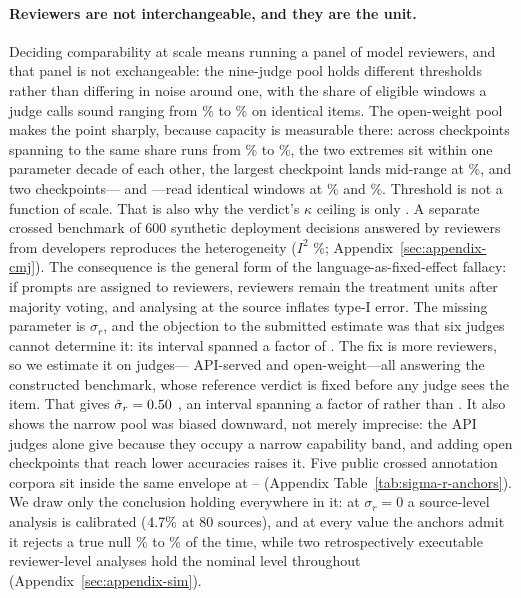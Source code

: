 \documentclass[11pt]{article}
\begin{document}
\paragraph{Reviewers are not interchangeable, and they are the unit.}
Deciding comparability at scale means running a panel of model reviewers, and
that panel is not exchangeable: the nine-judge pool holds different thresholds
rather than differing in noise around one, with the share of eligible windows a
judge calls sound ranging from \TierSurvivesLo\% to \TierSurvivesHi\% on
identical items. The open-weight pool makes the point sharply, because capacity is
measurable there: across \OwjNOpen{} checkpoints spanning \OwjPairSize{} to
\OwjBigSize{} the same share runs from \OwjSurvLo\% to \OwjSurvHi\%, the two
extremes sit within one parameter decade of each other, the largest checkpoint
lands mid-range at \OwjBigSurv\%, and two \OwjPairSize{} checkpoints---
\texttt{\OwjPairLoName{}} and \texttt{\OwjPairHiName{}}---read identical
windows at \OwjPairLo\% and \OwjPairHi\%. Threshold is not a function of
scale.
That is also why the verdict's $\kappa$ ceiling is only \KmaxVerdict{}. A separate crossed benchmark of 600 synthetic deployment
decisions answered by \CMJmodels{} reviewers from \CMJdevelopers{} developers
reproduces the heterogeneity ($I^2$ \CMJCtwoIsq\%;
Appendix~\ref{sec:appendix-cmj}). The consequence is the general form of the
language-as-fixed-effect fallacy: if prompts are assigned to reviewers,
reviewers remain the treatment units after majority voting, and analysing at the
source inflates type-I error. The missing parameter is $\sigma_r$, and the objection to the submitted estimate was that six judges cannot determine it: its interval spanned a factor of \SigInsRatio{}. The fix is more reviewers, so we estimate it on \OwjNTotal{} judges---\OwjNApi{} API-served and \OwjNOpen{} open-weight---all answering the constructed benchmark, whose reference verdict is fixed before any judge sees the item. That gives $\hat\sigma_r=0.50{}$ \OwjSigPooledCI{}, an interval spanning a factor of \OwjSigRatio{} rather than \SigInsRatio{}. It also shows the narrow pool was biased downward, not merely imprecise: the API judges alone give \OwjSigApi{} because they occupy a narrow capability band, and adding open checkpoints that reach lower accuracies raises it. Five public crossed annotation corpora sit inside the same envelope at \SigmaMin{}--\SigmaMax{} (Appendix Table~\ref{tab:sigma-r-anchors}). We draw only the conclusion holding everywhere
in it: at $\sigma_r=0$ a source-level analysis is calibrated
($4.7\%$ at 80 sources), and at every value the anchors admit it rejects
a true null \SigTypeILo\% to \SigTypeIHi\% of the time, while two
retrospectively executable reviewer-level analyses hold the nominal level
throughout (Appendix~\ref{sec:appendix-sim}).
\end{document}
